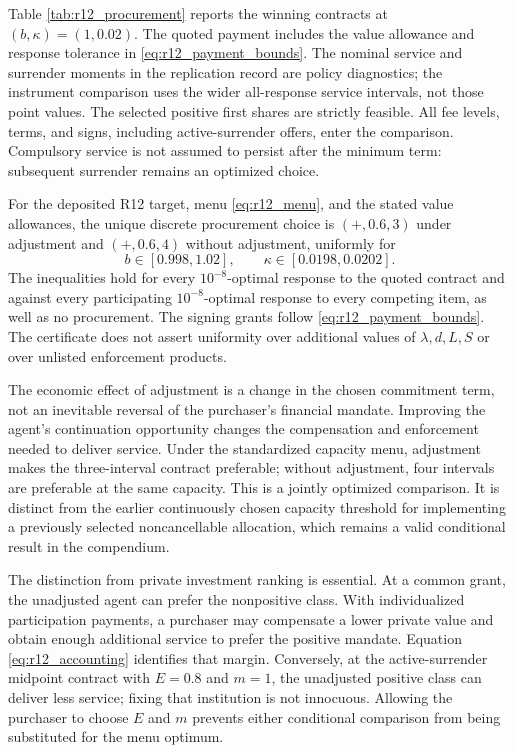 Table \ref{tab:r12_procurement} reports the winning contracts at $(b,\kappa)=(1,0.02)$. The quoted payment includes the value allowance and response tolerance in \eqref{eq:r12_payment_bounds}. The nominal service and surrender moments in the replication record are policy diagnostics; the instrument comparison uses the wider all-response service intervals, not those point values. The selected positive first shares are strictly feasible. All fee levels, terms, and signs, including active-surrender offers, enter the comparison. Compulsory service is not assumed to persist after the minimum term: subsequent surrender remains an optimized choice.

\begin{theorem}
\label{thm:r12_numerical}
For the deposited R12 target, menu \eqref{eq:r12_menu}, and the stated value allowances, the unique discrete procurement choice is $(+,0.6,3)$ under adjustment and $(+,0.6,4)$ without adjustment, uniformly for
\begin{equation}
 b\in[0.998,1.02],\qquad\kappa\in[0.0198,0.0202].
 \label{eq:r12_pricebox}
\end{equation}
The inequalities hold for every $10^{-8}$-optimal response to the quoted contract and against every participating $10^{-8}$-optimal response to every competing item, as well as no procurement. The signing grants follow \eqref{eq:r12_payment_bounds}. The certificate does not assert uniformity over additional values of $\lambda,d,L,S$ or over unlisted enforcement products.
\end{theorem}

The economic effect of adjustment is a change in the chosen commitment term, not an inevitable reversal of the purchaser's financial mandate. Improving the agent's continuation opportunity changes the compensation and enforcement needed to deliver service. Under the standardized capacity menu, adjustment makes the three-interval contract preferable; without adjustment, four intervals are preferable at the same capacity. This is a jointly optimized comparison. It is distinct from the earlier continuously chosen capacity threshold for implementing a previously selected noncancellable allocation, which remains a valid conditional result in the compendium.

The distinction from private investment ranking is essential. At a common grant, the unadjusted agent can prefer the nonpositive class. With individualized participation payments, a purchaser may compensate a lower private value and obtain enough additional service to prefer the positive mandate. Equation \eqref{eq:r12_accounting} identifies that margin. Conversely, at the active-surrender midpoint contract with $E=0.8$ and $m=1$, the unadjusted positive class can deliver less service; fixing that institution is not innocuous. Allowing the purchaser to choose $E$ and $m$ prevents either conditional comparison from being substituted for the menu optimum.

